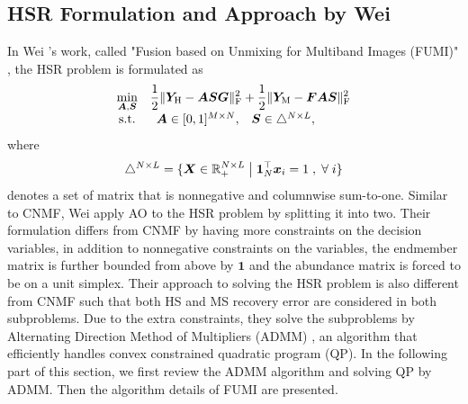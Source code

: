 \subsection{HSR Formulation and Approach by Wei \etal}
In Wei \etal's work, called "Fusion based on Unmixing for Multiband Images
(FUMI)"
\cite{FUMI},
the HSR problem is formulated as
\begin{equation}
    \begin{array}{cl}
        \underset{\bm A ,\bm S}{\min} &
        \displaystyle
        \frac{1}{2} \Vert \bm Y_\text H - \bm A \bm S \bm G \Vert_\text F^2 +
        \frac{1}{2} \Vert \bm Y_\text M - \bm F \bm A \bm S \Vert_\text F^2 \\
        \text{s.t.} &
        \begin{array}{ccc}
            \bm A \in [0,1]^{M \times N}, &
            \bm S \in \triangle^{N \times L},
        \end{array}
    \end{array}
    \label{eq:HSR_FUMI}
\end{equation}
where
\begin{equation}
    \triangle^{N \times L} = \{\bm X \in \mathbb R_+^{N \times L} \; \big| \;
                               \bm 1_N^\top \bm x_i = 1      \; ,     \;
                               \forall \; i\}
    \label{eq:simplex}
\end{equation}
denotes a set of matrix that is nonnegative and columnwise sum-to-one.
Similar to CNMF, Wei \etal apply AO to the HSR problem by splitting it into
two.
Their formulation differs from CNMF by having more constraints on the decision
variables, \ie in addition to nonnegative constraints on the variables, the
endmember matrix is further bounded from above by $\bm 1$ and the abundance
matrix is forced to be on a unit simplex.
Their approach to solving the HSR problem is also different from CNMF such
that both HS and MS recovery error are considered in both subproblems.
Due to the extra constraints, they solve the subproblems by Alternating
Direction Method of Multipliers (ADMM)
\cite{ADMM_BOYD2011},
an algorithm that efficiently handles convex constrained quadratic program (QP).
In the following part of this section, we first review the ADMM algorithm and
solving QP by ADMM.
Then the algorithm details of FUMI are presented.

